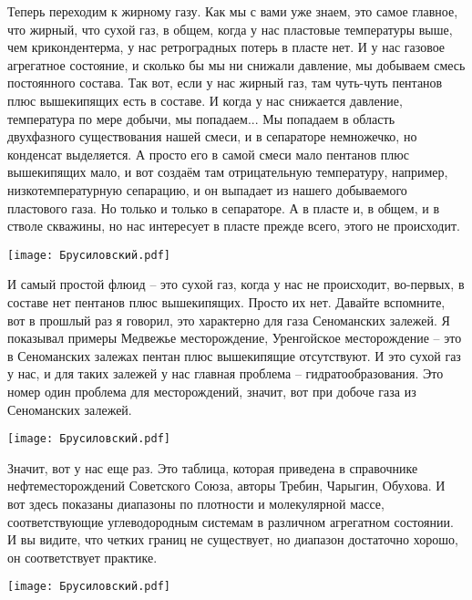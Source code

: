 \documentclass[main.tex]{subfiles}
\begin{document}
Теперь переходим к жирному газу.
Как мы с вами уже знаем, это самое главное, что жирный, что сухой газ, в общем, когда у нас пластовые температуры выше, чем крикондентерма, у нас ретроградных потерь в пласте нет.
И у нас газовое агрегатное состояние, и сколько бы мы ни снижали давление, мы добываем смесь постоянного состава.
Так вот, если у нас жирный газ, там чуть-чуть пентанов плюс вышекипящих есть в составе.
И когда у нас снижается давление, температура по мере добычи, мы попадаем...
Мы попадаем в область двухфазного существования нашей смеси, и в сепараторе немножечко, но конденсат выделяется.
А просто его в самой смеси мало пентанов плюс вышекипящих мало, и вот создаём там отрицательную температуру, например, низкотемпературную сепарацию, и он выпадает из нашего добываемого пластового газа.
Но только и только в сепараторе.
А в пласте и, в общем, и в стволе скважины, но нас интересует в пласте прежде всего, этого не происходит.

\begin{center}
\texttt{[image: Брусиловский.pdf]}
\end{center}

И самый простой флюид -- это сухой газ, когда у нас не происходит, во-первых, в составе нет пентанов плюс вышекипящих.
Просто их нет.
Давайте вспомните, вот в прошлый раз я говорил, это характерно для газа Сеноманских залежей.
Я показывал примеры Медвежье месторождение, Уренгойское месторождение -- это в Сеноманских залежах пентан плюс вышекипящие отсутствуют.
И это сухой газ у нас, и для таких залежей у нас главная проблема -- гидратообразования.
Это номер один проблема для месторождений, значит, вот при добоче газа из Сеноманских залежей.

\begin{center}
\texttt{[image: Брусиловский.pdf]}
\end{center}

Значит, вот у нас еще раз.
Это таблица, которая приведена в справочнике нефтеместорождений Советского Союза, авторы Требин, Чарыгин, Обухова.
И вот здесь показаны диапазоны по плотности и молекулярной массе, соответствующие углеводородным системам в различном агрегатном состоянии.
И вы видите, что четких границ не существует, но диапазон достаточно хорошо, он соответствует практике.

\begin{center}
\texttt{[image: Брусиловский.pdf]}
\end{center}
\end{document}
